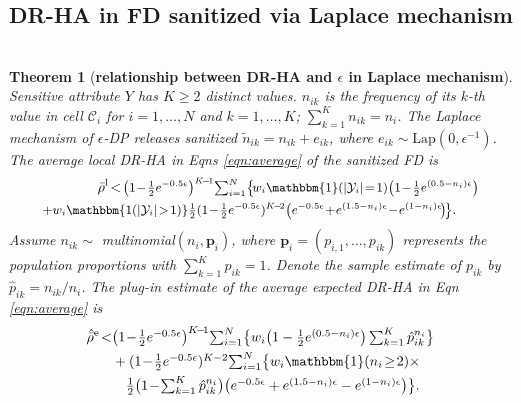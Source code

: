 \documentclass[10pt,journal,compsoc]{IEEEtran}
\newtheorem{thm}{\vspace{-6pt}\\ Theorem}
\newcommand{\p}{\mathbf{p}}
\newcommand{\C}{\mathcal{C}}
\begin{document}
\vspace{-6pt}\subsection{DR-HA in FD sanitized via Laplace mechanism}
\label{sec:laplace}\vspace{-9pt}
\begin{thm}[\textbf{relationship between DR-HA and $\epsilon$ in Laplace mechanism}]\label{thm:rho.lap.K}
Sensitive attribute $Y\!$ has $K\!\ge\!2$ distinct values. $n_{ik}$ is the frequency of its $k$-th value in cell $\C_i$ for $i\!=\!1,\ldots,N$ and $k\!=\!1,\ldots,K$; $\sum_{k=1}^{K}n_{ik}\!=\!n_i$. The Laplace mechanism of $\epsilon$-DP releases sanitized $\tilde{n}_{ik}\!=\!n_{ik}\!+\!e_{ik}$, where $e_{ik}\!\sim\!\mbox{Lap}(0,\epsilon^{-1})$. The average local DR-HA in Eqns \eqref{eqn:average} of the sanitized FD is 
\begin{align}
\!\!\!\!\bar{\rho}^{\text{l}}\!<\!
\mbox{\small $\big(1\!-\!\frac{1}{2}e^{-0.5\epsilon}$}&
\mbox{\small $\big)^{K\!-\!1}\!\sum_{i=1}^N\!\big\{\!w_i \mathbbm{1}(|\mathcal{Y}_i|\!=\!1)\big(1\!-\!\frac{1}{2}e^{(0.5-n_i)\epsilon}\big)$}\!\!\!\!\label{eqn:averagel.lap.K}\\
\!\!\!\!
\mbox{\small $+ w_i\mathbbm{1(|\mathcal{Y}_i|\!>\!1)}$}&
\mbox{\small $\frac{1}{2}(1\!-\!\frac{1}{2}e^{-0.5\epsilon})^{K\!-\!2}\big(e^{-0.5\epsilon}\!+\!e^{(1.5-n_i)\epsilon}\!-\!e^{(1-n_i)\epsilon}\!\big)\!\big\}$}.\notag
\end{align}
\normalsize
Assume $n_{ik}\sim$ multinomial$(n_i,\p_i)$, where  $\p_i\!=\!(p_{i,1},\ldots,p_{ik})$ represents the population proportions with $\sum_{k=1}^{K}p_{ik}=1$. Denote the sample estimate of $p_{ik}$ by $\hat{p}_{ik}=n_{ik}/n_i$. The plug-in estimate of the average expected DR-HA in Eqn \eqref{eqn:average} is \vspace{-3pt}
\begin{align}
\hat{\bar{\rho}}^{\text{e}}\!<& \textstyle \big(1\!-\!\frac{1}{2}e^{-0.5\epsilon}\big)^{K\!-\!1}\!\sum_{i=1}^N\!\big\{w_i\big(1-\frac{1}{2}e^{(0.5-n_i)\epsilon}\big)\sum_{k=1}^{K}\hat{p}_{ik}^{n_i}\big\}\notag\\
&\textstyle + (1\!-\!\frac{1}{2}e^{-0.5\epsilon})^{K-2}\!\sum_{i=1}^N\!\big\{w_i\mathbbm{1}(n_i\!\ge\!2)\times\label{eqn:averagee.lap.K}\\
&\textstyle\quad\frac{1}{2}\big(1\!-\!\sum_{k=1}^{K}\hat{p}_{ik}^{n_i}\big)\big(e^{-0.5\epsilon}+e^{(1.5-n_i)\epsilon}-e^{(1-n_i)\epsilon}\big)\big\}.\!\notag
\end{align}

\end{thm}
\end{document}
